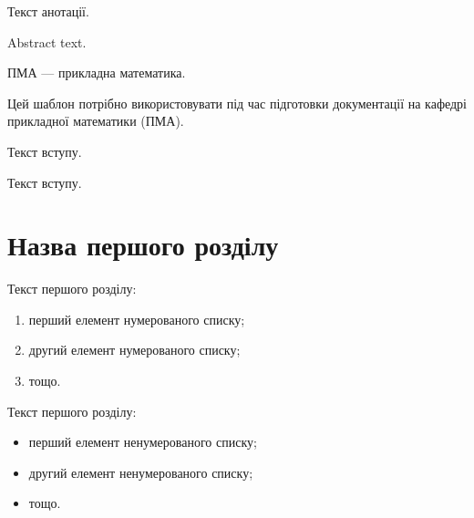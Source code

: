 \documentclass{xedstu}
\begin{document}

\abstractUkr
Текст анотації.

\abstractEng
Abstract text.

\tableofcontents

\shortings
ПМА --- прикладна математика.

\intro
Цей шаблон потрібно використовувати під час підготовки документації на кафедрі прикладної математики (ПМА). 

Текст вступу.

Текст вступу.

\chapter{Назва першого розділу}
\label{chap:first}

Текст першого розділу:
\begin{enumerate}
	\item перший елемент нумерованого списку;
	\item другий елемент нумерованого списку;
	\item тощо.
\end{enumerate}

Текст першого розділу:
\begin{itemize}
	\item перший елемент ненумерованого списку;
	\item другий елемент ненумерованого списку;
	\item тощо.
\end{itemize}
\end{document}
